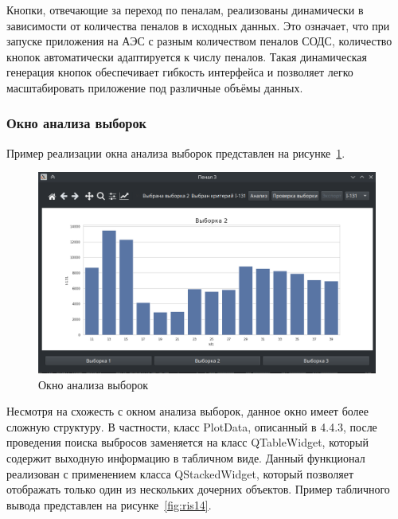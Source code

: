 Кнопки, отвечающие за переход по пеналам, реализованы динамически в зависимости от количества пеналов в исходных данных. Это означает, что при запуске приложения на АЭС с разным количеством пеналов СОДС, количество кнопок автоматически адаптируется к числу пеналов. Такая динамическая генерация кнопок обеспечивает гибкость интерфейса и позволяет легко масштабировать приложение под различные объёмы данных.

\subsubsection{Окно анализа выборок}

Пример реализации окна анализа выборок представлен на рисунке~\ref{fig:ris9}.

\begin{figure}[H]
	\centering
	\includegraphics[width=1\linewidth]{pics/ris9} %
	\caption{Окно анализа выборок}
	\label{fig:ris9} %
\end{figure}

Несмотря на схожесть с окном анализа выборок, данное окно имеет более сложную структуру. В частности, класс PlotData, описанный в 4.4.3, после проведения поиска выбросов заменяется на класс QTableWidget, который содержит выходную информацию в табличном виде. Данный функционал реализован с применением класса QStackedWidget, который позволяет отображать только один из нескольких дочерних объектов. Пример табличного вывода представлен на рисунке~\ref{fig:ris14}.

